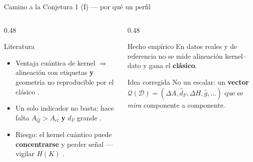 \documentclass[aspectratio=169,10pt,professionalfonts]{beamer}
\begin{document}
\begin{frame}{Camino a la Conjetura 1 (I) --- por qué un perfil}
\begin{columns}[T]
\begin{column}{0.48\textwidth}
\begin{block}{Literatura}
\begin{itemize}
  \item Ventaja cuántica de kernel $\Rightarrow$
        alineación con etiquetas \textbf{y}
        geometría no reproducible por el
        clásico \citep{huang2021, liu2021}.
  \item Un solo indicador no basta:
        hace falta $A_Q > A_{cl}$
        \textbf{y} $d_F$ grande
        \citep{huang2021, schuld2021}.
  \item Riesgo: el kernel cuántico puede
        \textbf{concentrarse} y perder señal
        --- vigilar $H(K)$ \citep{thanasilp2022}.
\end{itemize}
\end{block}
\end{column}
\begin{column}{0.48\textwidth}
\begin{block}{Hecho empírico}
En datos reales y de referencia
no se mide alineación kernel--dato
y gana el \textbf{clásico}.
\end{block}
\vspace{0.5em}
\begin{block}{Idea corregida}
No un escalar: un \textbf{vector}
$\mathcal{Q}(\mathcal{D})=(\Delta A,\hat{d}_F,\Delta H,\hat g,\ldots)$
que se \emph{mira} componente a componente.
\end{block}
\end{column}
\end{columns}
\end{frame}
\end{document}

